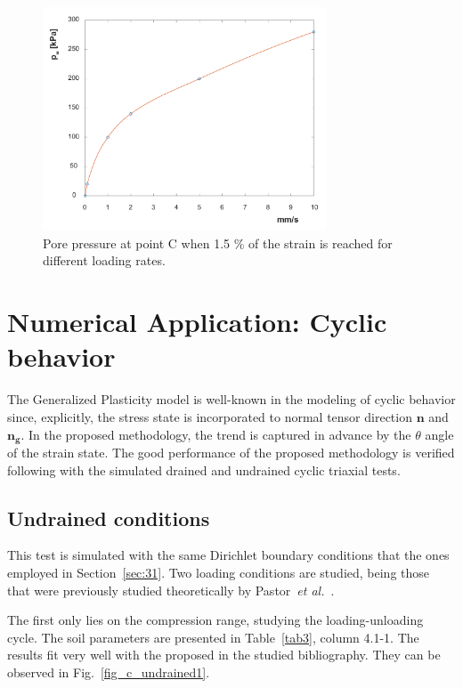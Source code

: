 \documentclass[preprint,12pt,a4paper]{elsarticle}
\begin{document}
\begin{figure}
\centering
\includegraphics[width=0.75\textwidth]{Figs/excess_porepressure.pdf}
\caption{Pore pressure at point C when 1.5 \% of the strain is reached for different loading rates.}
\label{fig_pw}
\end{figure}

\section{Numerical Application: Cyclic behavior}
\label{sec:4}
The Generalized Plasticity model is well-known in the modeling of cyclic behavior since, explicitly, the stress state is incorporated to  normal tensor direction $ \boldsymbol{n}$ and $ \boldsymbol{n_g}$. In the proposed methodology, the trend is captured in advance by the $\theta$ angle of the strain state. The good performance of the proposed methodology is verified following with the simulated drained and undrained cyclic triaxial tests.

\subsection{Undrained conditions}
\label{subsec:41}
This test is simulated with the same Dirichlet boundary conditions that the ones employed in Section~\ref{sec:31}. Two loading conditions are studied, being those that were previously studied theoretically by Pastor~\textit{et al.}~\cite{PastorZC:90}. 

The first only lies on the compression range, studying the loading-unloading cycle. The soil parameters are presented in Table~\ref{tab3}, column 4.1-1. The results fit very well with the proposed in the studied bibliography. They can be observed in Fig.~\ref{fig_c_undrained1}.
\end{document}
